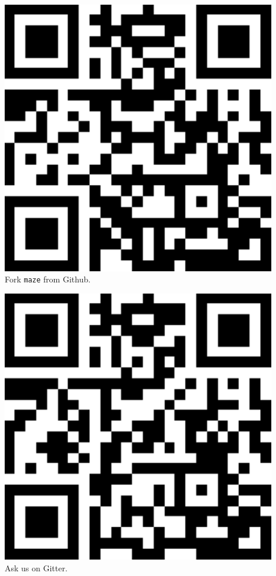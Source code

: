 \documentclass[a0,portrait]{a0poster}
\begin{document}
\begin{multicols}{2}
\begin{minipage}[b]{0.5\linewidth}
  \centering
  \includegraphics[width=12cm]{../fig/github.png}\\[1cm]
  \large Fork \texttt{maze} from Github.
\end{minipage}
\begin{minipage}[b]{0.5\linewidth}
  \centering
  \includegraphics[width=12cm]{../fig/gitter.png}\\[1cm]
  \large Ask us on Gitter.
\end{minipage}


\end{multicols}
\end{document}
